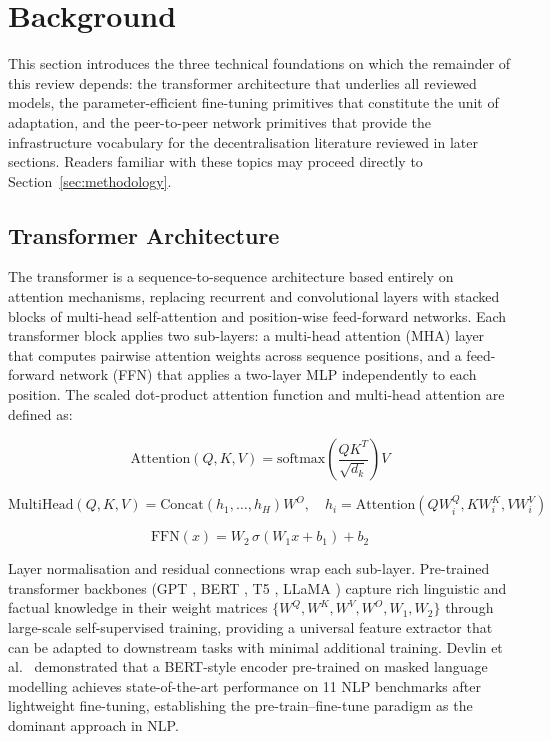 \section{Background}
\label{sec:background}

This section introduces the three technical foundations on which the
remainder of this review depends: the transformer architecture that underlies
all reviewed models, the parameter-efficient fine-tuning primitives that
constitute the unit of adaptation, and the peer-to-peer network primitives
that provide the infrastructure vocabulary for the decentralisation
literature reviewed in later sections. Readers familiar with these topics
may proceed directly to Section~\ref{sec:methodology}.

\subsection{Transformer Architecture}
\label{sec:background:transformer}

The transformer \cite{Vaswani2017} is a sequence-to-sequence architecture based
entirely on attention mechanisms, replacing recurrent and convolutional layers with
stacked blocks of multi-head self-attention and position-wise feed-forward networks.
Each transformer block applies two sub-layers: a multi-head attention (MHA) layer
that computes pairwise attention weights across sequence positions, and a feed-forward
network (FFN) that applies a two-layer MLP independently to each position. The
scaled dot-product attention function and multi-head attention are defined as:

\begin{equation}
\mathrm{Attention}(Q,K,V) = \mathrm{softmax}\!\left(\frac{Q K^T}{\sqrt{d_k}}\right) V
\label{eq:attention}
\end{equation}

\begin{equation}
\mathrm{MultiHead}(Q,K,V) = \mathrm{Concat}(h_1,\ldots,h_H) W^O,
\quad h_i = \mathrm{Attention}(Q W^Q_i, K W^K_i, V W^V_i)
\label{eq:mha}
\end{equation}

\begin{equation}
\text{FFN}(x) = W_2 \, \sigma(W_1 x + b_1) + b_2
\label{eq:ffn}
\end{equation}

Layer normalisation and residual connections wrap each sub-layer. Pre-trained
transformer backbones (GPT \cite{RadfordGPT22019,BrownGPT32020}, BERT \cite{Devlin2019}, T5 \cite{RaffelT52020}, LLaMA \cite{TouvronLLaMA2023}) capture rich linguistic and factual
knowledge in their weight matrices $\{W^Q, W^K, W^V, W^O, W_1, W_2\}$ through
large-scale self-supervised training, providing a universal feature extractor that
can be adapted to downstream tasks with minimal additional training. Devlin et al.~\cite{Devlin2019}
demonstrated that a BERT-style encoder pre-trained on masked language modelling
achieves state-of-the-art performance on 11 NLP benchmarks after lightweight
fine-tuning, establishing the pre-train--fine-tune paradigm as the dominant approach
in NLP.

